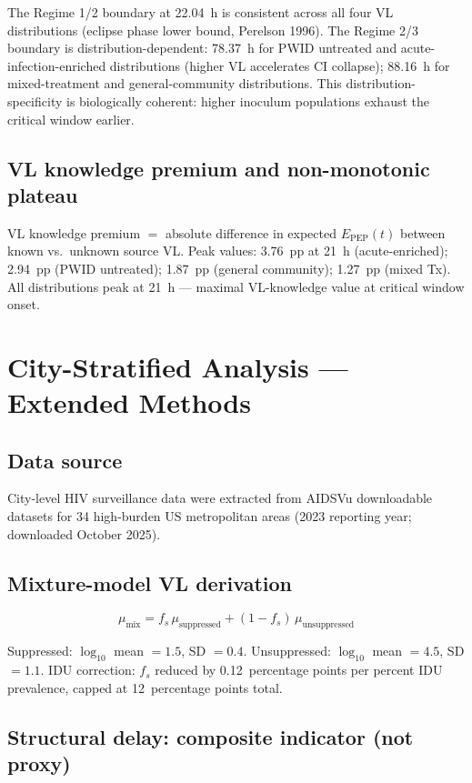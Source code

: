 \documentclass[11pt]{article}
\theoremstyle{definition}
\theoremstyle{remark}
\newcommand{\Epep}{E_{\text{PEP}}}
\begin{document}
The Regime 1/2 boundary at 22.04~h is consistent across all four VL distributions (eclipse phase lower bound, Perelson 1996). The Regime 2/3 boundary is distribution-dependent: 78.37~h for PWID untreated and acute-infection-enriched distributions (higher VL accelerates CI collapse); 88.16~h for mixed-treatment and general-community distributions. This distribution-specificity is biologically coherent: higher inoculum populations exhaust the critical window earlier.

\subsection{VL knowledge premium and non-monotonic plateau}

VL knowledge premium $=$ absolute difference in expected $\Epep(t)$ between known vs.\ unknown source VL. Peak values: 3.76~pp at 21~h (acute-enriched); 2.94~pp (PWID untreated); 1.87~pp (general community); 1.27~pp (mixed Tx). All distributions peak at 21~h --- maximal VL-knowledge value at critical window onset.


\section{City-Stratified Analysis --- Extended Methods}

\subsection{Data source}

City-level HIV surveillance data were extracted from AIDSVu downloadable datasets for 34 high-burden US metropolitan areas (2023 reporting year; downloaded October 2025).

\subsection{Mixture-model VL derivation}

\begin{equation}
\mu_{\text{mix}} = f_{s}\,\mu_{\text{suppressed}} + (1 - f_{s})\,\mu_{\text{unsuppressed}}
\label{eq:mixture}
\end{equation}

Suppressed: $\log_{10}$ mean $= 1.5$, SD $= 0.4$. Unsuppressed: $\log_{10}$ mean $= 4.5$, SD $= 1.1$. IDU correction: $f_{s}$ reduced by 0.12~percentage points per percent IDU prevalence, capped at 12~percentage points total.

\subsection{Structural delay: composite indicator (not proxy)}
\end{document}
